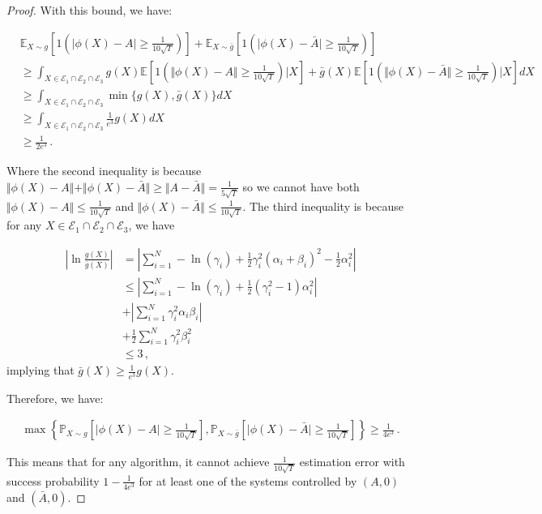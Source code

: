 \documentclass{article}
\theoremstyle{definition}
\begin{document}
\begin{proof}
With this bound, we have:

\begin{align*}
&\mathbb{E}_{X\sim g}\left[1\left(\vert \phi(X)-A\vert\geq\frac{1}{10\sqrt{T}}\right)\right]+\mathbb{E}_{X\sim \bar{g}}\left[1\left(\vert \phi(X)-\bar{A}\vert\geq\frac{1}{10\sqrt{T}}\right)\right]\\
&\geq \int_{X\in\mathcal{E}_{1}\cap \mathcal{E}_{2}\cap \mathcal{E}_{3}} g(X)\mathbb{E}\left[1\left(\Vert \phi(X)-A\Vert\geq\frac{1}{10\sqrt{T}}\right)\big\vert X\right]+\bar{g}(X)\mathbb{E}\left[1\left(\Vert \phi(X)-\bar{A}\Vert\geq\frac{1}{10\sqrt{T}}\right)\big\vert X\right] dX\\
&\geq \int_{X\in\mathcal{E}_{1}\cap \mathcal{E}_{2}\cap \mathcal{E}_{3}}\min\{g(X),\bar{g}(X)\}dX\\
&\geq \int_{X\in\mathcal{E}_{1}\cap \mathcal{E}_{2}\cap \mathcal{E}_{3}}\frac{1}{e^{3}}g(X)dX\\
&\geq\frac{1}{2e^{3}}\,.
\end{align*}

Where the second inequality is because $\Vert \phi(X)-A\Vert+\Vert \phi(X)-\bar{A}\Vert\geq \Vert A-\bar{A}\Vert =\frac{1}{5\sqrt{T}}$ so we cannot have both $\Vert \phi(X)-A\Vert\leq \frac{1}{10\sqrt{T}}$ and $\Vert \phi(X)-\bar{A}\Vert\leq\frac{1}{10\sqrt{T}}$. The third inequality is because for any $X\in \mathcal{E}_{1}\cap\mathcal{E}_{2}\cap\mathcal{E}_{3}$, we have

\begin{align*}
\left\vert \ln\frac{g(X)}{\bar{g}(X)}\right\vert&=\left\vert\sum_{i=1}^{N}-\ln(\gamma_{i})+\frac{1}{2}\gamma^{2}_{i}(\alpha_{i}+\beta_{i})^{2}-\frac{1}{2}\alpha_{i}^{2}\right\vert\\
&\leq \left\vert \sum_{i=1}^{N}-\ln(\gamma_{i})+\frac{1}{2}(\gamma^{2}_{i}-1)\alpha_{i}^{2}\right\vert\\
&+\left\vert \sum_{i=1}^{N} \gamma_{i}^{2}\alpha_{i}\beta_{i}\right\vert\\
&+\frac{1}{2}\sum_{i=1}^{N}\gamma^{2}_{i}\beta^{2}_{i}\\
&\leq 3\,,
\end{align*}
implying that $\bar{g}(X)\geq\frac{1}{e^{3}}g(X)$.



Therefore, we have:

\begin{align*}
\max\left\{\mathbb{P}_{X\sim g}\left[\vert \phi(X)-A\vert\geq\frac{1}{10\sqrt{T}}\right],\mathbb{P}_{X\sim \bar{g}}\left[\vert \phi(X)-\bar{A}\vert\geq \frac{1}{10\sqrt{T}}\right]\right\}\geq \frac{1}{4e^{3}}\,.
\end{align*}

This means that for any algorithm, it cannot achieve $\frac{1}{10\sqrt{T}}$ estimation error with success probability $1-\frac{1}{4e^{3}}$ for at least one of the systems controlled by $(A,0)$ and $(\bar{A},0)$.







\end{proof}
\end{document}
